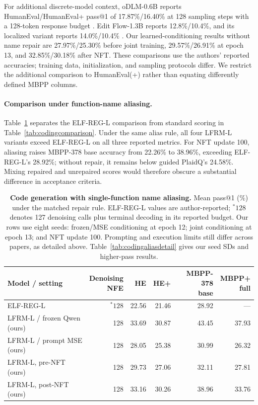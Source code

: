 \documentclass{article}
\begin{document}
For additional discrete-model context, oDLM-0.6B reports HumanEval/HumanEval+ pass@1 of 17.87\%/16.40\% at 128 sampling steps with a 128-token response budget \citep[Table 1 and Appendix B.7]{odlm}. Edit Flow-1.3B reports 12.8\%/10.4\%, and its localized variant reports 14.0\%/10.4\% \citep[Table 3]{editflow}. Our learned-conditioning results without name repair are 27.97\%/25.30\% before joint training, 29.57\%/26.91\% at epoch 13, and 32.85\%/30.18\% after NFT. These comparisons use the authors' reported accuracies; training data, initialization, and sampling protocols differ. We restrict the additional comparison to HumanEval(+) rather than equating differently defined MBPP columns.

\paragraph{Comparison under function-name aliasing.}
Table~\ref{tab:codingaliascomparison} separates the ELF-REG-L comparison from standard scoring in Table~\ref{tab:codingcomparison}. Under the same alias rule, all four LFRM-L variants exceed ELF-REG-L on all three reported metrics. For NFT update 100, aliasing raises MBPP-378 base accuracy from 22.26\% to 38.96\%, exceeding ELF-REG-L's 28.92\%; without repair, it remains below guided PlaidQ's 24.58\%. Mixing repaired and unrepaired scores would therefore obscure a substantial difference in acceptance criteria.

\begin{table}[htbp]
\centering\small
\setlength{\tabcolsep}{4pt}
\caption{\textbf{Code generation with single-function name aliasing.} Mean pass@1 (\%) under the matched repair rule. ELF-REG-L values are author-reported; $^{*}128$ denotes 127 denoising calls plus terminal decoding in its reported budget. Our rows use eight seeds: frozen/MSE conditioning at epoch 12; joint conditioning at epoch 13; and NFT update 100. Prompting and execution limits still differ across papers, as detailed above. Table~\ref{tab:codingaliasdetail} gives our seed SDs and higher-pass results.}
\label{tab:codingaliascomparison}
\begin{tabular}{@{}lrrrrr@{}}
\toprule
Model / setting & \shortstack{Denoising\\NFE} & HE & HE+ & \shortstack{MBPP-378\\base} & \shortstack{MBPP+\\full} \\
\midrule
ELF-REG-L \citep{scalingdlm} & $^{*}128$ & 22.56 & 21.46 & 28.92 & ---\\
LFRM-L / frozen Qwen (ours) & 128 & 33.69 & 30.87 & 43.45 & 37.93\\
LFRM-L / prompt MSE (ours) & 128 & 28.05 & 25.38 & 30.99 & 26.32\\
LFRM-L, pre-NFT (ours) & 128 & 29.73 & 27.06 & 32.11 & 27.81\\
LFRM-L, post-NFT (ours) & 128 & 33.16 & 30.26 & 38.96 & 33.76\\
\bottomrule
\end{tabular}
\end{table}
\end{document}
